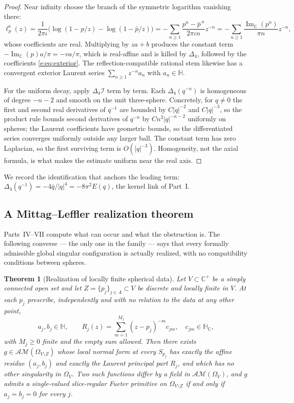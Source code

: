 \documentclass[11pt,a4paper]{article}
\numberwithin{equation}{section}
\newtheorem{theorem}{Theorem}[section]
\theoremstyle{definition}
\theoremstyle{remark}
\theoremstyle{plain}
\newcommand{\HH}{\mathbb H}
\newcommand{\HC}{\mathbb H_{\mathbb C}}
\newcommand{\CC}{\mathbb C}
\newcommand{\Cplus}{\CC^{+}}
\DeclareMathOperator{\Ima}{Im}
\newcommand{\lap}{\Delta_4}
\newcommand{\I}{\mathcal I}
\newcommand{\AM}{\mathcal{AM}}
\newcommand{\Om}{\Omega}
\newcommand{\abs}[1]{\lvert #1\rvert}
\begin{document}
\begin{proof}
Near infinity choose the branch of the symmetric logarithm vanishing
there:
\[
 \ell^{\mathrm s}_p(z)
 =\frac1{2\pi\iota}\bigl(\log(1-p/z)-\log(1-\bar p/z)\bigr)
 =-\sum_{n\ge1}\frac{p^n-\bar p^{\,n}}{2\pi\iota n}z^{-n}
 =-\sum_{n\ge1}\frac{\Ima_{\CC}(p^n)}{\pi n}z^{-n},
\]
whose coefficients are real. Multiplying by $za+b$ produces the constant
term $-\Ima_{\CC}(p)a/\pi=-va/\pi$, which is real-affine and is killed by
$\lap$, followed by the coefficients \eqref{e:eq:exterior}. The
reflection-compatible rational stem likewise has a convergent exterior
Laurent series $\sum_{n\ge1}z^{-n}a_n$ with $a_n\in\HH$.

For the uniform decay, apply $\lap\I$ term by term. Each
$\lap(q^{-n})$ is homogeneous of degree $-n-2$ and smooth on the unit
three-sphere. Concretely, for $q\ne0$ the first and second real
derivatives of $q^{-1}$ are bounded by $C\abs q^{-2}$ and
$C\abs q^{-3}$, so the product rule bounds second derivatives of
$q^{-n}$ by $Cn^2\abs q^{-n-2}$ uniformly on spheres; the Laurent
coefficients have geometric bounds, so the differentiated series
converges uniformly outside any larger ball. The constant term has zero
Laplacian, so the first surviving term is $O(\abs q^{-3})$. Homogeneity,
not the axial formula, is what makes the estimate uniform near the real
axis.
\end{proof}

We record the identification that anchors the leading term:
$\lap(q^{-1})=-4\bar q/\abs q^4=-8\pi^2E(q)$, the kernel link of
Part~I.

\subsection{A Mittag--Leffler realization theorem}
\label{e:sec:ML}

Parts~IV--VII compute what can occur and what the obstruction is. The
following converse --- the only one in the family --- says that every
formally admissible global singular configuration is actually realized,
with no compatibility conditions between spheres.

\begin{theorem}[Realization of locally finite spherical data]
\label{e:thm:ML}
Let $V\subset\Cplus$ be a \emph{simply connected} open set and let
$Z=\{p_j\}_{j\in A}\subset V$ be discrete and locally finite in $V$. At
each $p_j$ prescribe, independently and with no relation to the data at
any other point,
\[
 a_j,b_j\in\HH,
 \qquad
 R_j(z)=\sum_{m=1}^{M_j}(z-p_j)^{-m}c_{jm},\quad c_{jm}\in\HC,
\]
with $M_j\ge0$ finite and the empty sum allowed. Then there exists
$g\in\AM(\Om_{V\setminus Z})$ whose local normal form at every
$S_{p_j}$ has exactly the affine residue $(a_j,b_j)$ and exactly the
Laurent principal part $R_j$, and which has no other singularity in
$\Om_V$. Two such functions differ by a field in $\AM(\Om_V)$, and $g$
admits a single-valued slice-regular Fueter primitive on
$\Om_{V\setminus Z}$ if and only if $a_j=b_j=0$ for every $j$.
\end{theorem}
\end{document}
